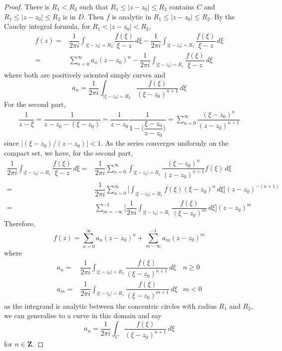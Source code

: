 \begin{proof}
There is $R_1<R_2$ such that $R_1\leq |z-z_0|\leq R_2$ contains $C$ and $R_1\leq |z-z_0|\leq R_2$ is in $D$. Then $f$ is analytic in $R_1\leq |z-z_0|\leq R_2$. By the Cauchy integral formula, for $R_1<|z-z_0|<R_2$,
\begin{align*}
f(z)=&\dfrac{1}{2\pi i}\int _{|\xi -z_0|=R_2}\dfrac{f(\xi )}{\xi -z}\,d\xi -\dfrac{1}{2\pi i}\int _{|\xi -z_0|=R_1}\dfrac{f(\xi )}{\xi -z}\,d\xi\\
=&\sum ^{\infty }_{n=0}a_{n}(z-z_0)^{n}-\dfrac{1}{2\pi i}\int _{|\xi -z_0|=R_1}\dfrac{f(\xi )}{\xi -z}\,d\xi 
\end{align*}
where both are positively oriented simply curves and 
\[a_{n}=\dfrac{1}{2\pi i}\int _{|\xi -z_0|=R_2}\dfrac{f(\xi )}{(\xi -z_0)^{n+1}}\,d\xi \]
For the second part, 
\begin{align*}
\dfrac{1}{z-\xi }=\dfrac{1}{z-z_0-(\xi -z_0)}=\dfrac{1}{z-z_0}\dfrac{1}{1-\Big(\dfrac{\xi -z_0}{z-z_0}\Big)}=\sum ^{\infty }_{n=0}\dfrac{(\xi -z_0)^{n}}{(z-z_0)^{n+1}}
\end{align*}
since $|(\xi -z_0)/(z-z_0)|<1$. As the series converges uniformly on the compact set, we have, for the second part,
\begin{align*}
\dfrac{1}{2\pi i}\int _{|\xi -z_0|=R_1}\dfrac{f(\xi )}{\xi -z}\,d\xi =&\dfrac{1}{2\pi i}\sum ^{\infty }_{n=0}\int _{|\xi -z_0|=R_1}\dfrac{(\xi -z_0)^{n}}{(z-z_0)^{n+1}}f(\xi )\,d\xi \\=&\dfrac{1}{2\pi i}\sum ^{\infty }_{n=0}\Big[\int_{|\xi -z_0|=R_1}f(\xi )(\xi -z_0)^{n}\,d\xi \Big](z-z_0)^{-(n+1)}\\
=&\sum ^{-1}_{m=-\infty }\Big[\dfrac{1}{2\pi i}\int _{|\xi -z_0|=R_1}\dfrac{f(\xi )}{(\xi -z_0)^{m}}\,d\xi \Big](z-z_0)^{m}
\end{align*}
Therefore,
\[f(z)=\sum ^{\infty }_{n=0}a_{n}(z-z_0)^{n}+\sum ^{-1}_{m-\infty }a_{m}(z-z_0)^{m}\]
where 
\begin{align*}
a_{n}=&\dfrac{1}{2\pi i}\int _{|\xi -z_0|=R_2}\dfrac{f(\xi )}{(\xi -z_0)^{n+1}}\,d\xi &n\geq 0\\
a_{m}=&\dfrac{1}{2\pi i}\int _{|\xi -z_0|=R_1}\dfrac{f(\xi )}{(\xi -z_0)^{m+1}}\,d\xi &m<0
\end{align*}
as the integrand is analytic between the concentric circles with radius $R_1$ and $R_2$, we can generalise to a curve in this domain and say
\[a_{n}=\dfrac{1}{2\pi i}\int _{C}\dfrac{f(\xi )}{(\xi -z_0)^{n+1}}\,d\xi \]
for $n\in {\bm Z}$.
\end{proof}
\vspace{2ex}
